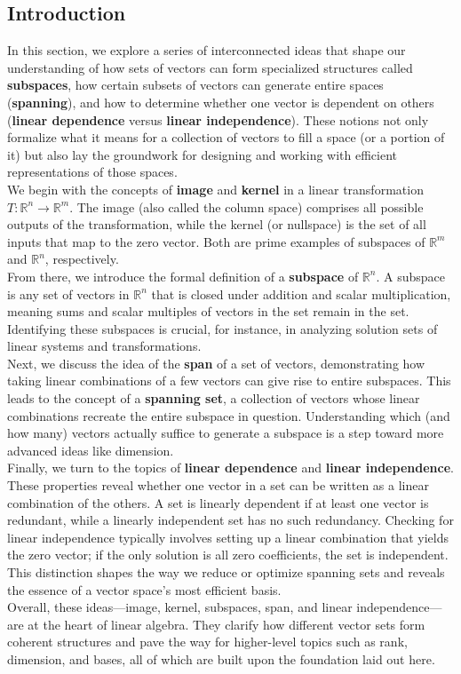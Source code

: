 \documentclass[a4paper, 9pt]{extarticle}
\begin{document}
\subsection*{Introduction}

\noindent In this section, we explore a series of interconnected ideas that shape our understanding of how sets of vectors can form specialized structures called \textbf{subspaces}, how certain subsets of vectors can generate entire spaces (\textbf{spanning}), and how to determine whether one vector is dependent on others (\textbf{linear dependence} versus \textbf{linear independence}). These notions not only formalize what it means for a collection of vectors to fill a space (or a portion of it) but also lay the groundwork for designing and working with efficient representations of those spaces.\\[2ex]
We begin with the concepts of \textbf{image} and \textbf{kernel} in a linear transformation $T:\mathbb{R}^n \to \mathbb{R}^m$. The image (also called the column space) comprises all possible outputs of the transformation, while the kernel (or nullspace) is the set of all inputs that map to the zero vector. Both are prime examples of subspaces of $\mathbb{R}^m$ and $\mathbb{R}^n$, respectively.
\\[2ex]
From there, we introduce the formal definition of a \textbf{subspace} of $\mathbb{R}^n$. A subspace is any set of vectors in $\mathbb{R}^n$ that is closed under addition and scalar multiplication, meaning sums and scalar multiples of vectors in the set remain in the set. Identifying these subspaces is crucial, for instance, in analyzing solution sets of linear systems and transformations. \\[2ex]
Next, we discuss the idea of the \textbf{span} of a set of vectors, demonstrating how taking linear combinations of a few vectors can give rise to entire subspaces. This leads to the concept of a \textbf{spanning set}, a collection of vectors whose linear combinations recreate the entire subspace in question. Understanding which (and how many) vectors actually suffice to generate a subspace is a step toward more advanced ideas like dimension. \\[2ex]
Finally, we turn to the topics of \textbf{linear dependence} and \textbf{linear independence}. These properties reveal whether one vector in a set can be written as a linear combination of the others. A set is linearly dependent if at least one vector is redundant, while a linearly independent set has no such redundancy. Checking for linear independence typically involves setting up a linear combination that yields the zero vector; if the only solution is all zero coefficients, the set is independent. This distinction shapes the way we reduce or optimize spanning sets and reveals the essence of a vector space’s most efficient basis. \\[2ex]
Overall, these ideas—image, kernel, subspaces, span, and linear independence—are at the heart of linear algebra. They clarify how different vector sets form coherent structures and pave the way for higher-level topics such as rank, dimension, and bases, all of which are built upon the foundation laid out here.
\end{document}
